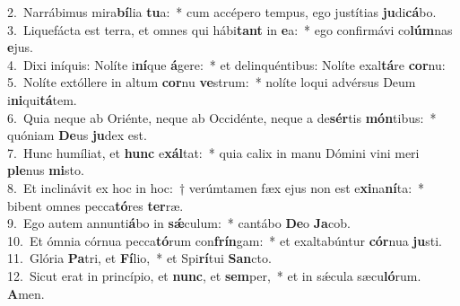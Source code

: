 {2.~}Narrábimus mira\textbf{bí}lia \textbf{tu}a:~* cum accépero tempus, ego justítias \textbf{ju}di\textbf{cá}bo.\\
{3.~}Liquefácta est terra, et omnes qui hábi\textbf{tant} in \textbf{e}a:~* ego confirmávi co\textbf{lúm}nas \textbf{e}jus.\\
{4.~}Dixi iníquis: Nolíte i\textbf{ní}que \textbf{á}gere:~* et delinquéntibus: Nolíte exal\textbf{tá}re \textbf{cor}nu:\\
{5.~}Nolíte extóllere in altum \textbf{cor}nu \textbf{ve}strum:~* nolíte loqui advérsus Deum i\textbf{ni}qui\textbf{tá}tem.\\
{6.~}Quia neque ab Oriénte, neque ab Occidénte, neque a de\textbf{sér}tis \textbf{món}tibus:~* quóniam \textbf{De}us \textbf{ju}dex est.\\
{7.~}Hunc humíliat, et \textbf{hunc} e\textbf{xál}tat:~* quia calix in manu Dómini vini meri \textbf{ple}nus \textbf{mi}sto.\\
{8.~}Et inclinávit ex hoc in hoc:~† verúmtamen fæx ejus non est e\textbf{xi}na\textbf{ní}ta:~* bibent omnes pecca\textbf{tó}res \textbf{ter}ræ.\\
{9.~}Ego autem annunti\textbf{á}bo in \textbf{sǽ}culum:~* cantábo \textbf{De}o \textbf{Ja}cob.\\
{10.~}Et ómnia córnua pecca\textbf{tó}rum con\textbf{frín}gam:~* et exaltabúntur \textbf{cór}nua \textbf{ju}sti.\\
{11.~}Glória \textbf{Pa}tri, et \textbf{Fí}lio,~* et Spi\textbf{rí}tui \textbf{San}cto.\\
{12.~}Sicut erat in princípio, et \textbf{nunc}, et \textbf{sem}per,~* et in sǽcula sæcu\textbf{ló}rum. \textbf{A}men.\\
